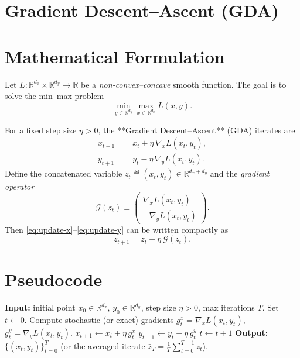 \documentclass{article}
\begin{document}
\section*{Gradient Descent–Ascent (GDA)}

\section*{Mathematical Formulation}
Let $L:\mathbb{R}^{d_x}\times\mathbb{R}^{d_y}\rightarrow\mathbb{R}$ be a \emph{non‑convex–concave} smooth function.  
The goal is to solve the min–max problem
\[
\min_{y\in\mathbb{R}^{d_y}}\max_{x\in\mathbb{R}^{d_x}} L(x,y).
\]

For a fixed step size $\eta>0$, the **Gradient Descent–Ascent** (GDA) iterates are
\begin{align}
x_{t+1} &= x_t + \eta\,\nabla_x L(x_t,y_t), \label{eq:update-x}\\
y_{t+1} &= y_t - \eta\,\nabla_y L(x_t,y_t). \label{eq:update-y}
\end{align}
Define the concatenated variable $z_t\eqdef (x_t,y_t)\in\mathbb{R}^{d_x+d_y}$ and the \emph{gradient operator}
\[
\mathcal{G}(z_t)\equiv \begin{pmatrix}
\nabla_x L(x_t,y_t)\\[2mm]
-\nabla_y L(x_t,y_t)
\end{pmatrix}.
\]
Then \eqref{eq:update-x}–\eqref{eq:update-y} can be written compactly as
\[
z_{t+1}=z_t+\eta\,\mathcal{G}(z_t).
\]

\section*{Pseudocode}
\begin{algorithm}[H]
\caption{Gradient Descent–Ascent (GDA)}
\begin{algorithmic}[1]
\State \textbf{Input:} initial point $x_0\in\mathbb{R}^{d_x}$, $y_0\in\mathbb{R}^{d_y}$, step size $\eta>0$, max iterations $T$.
\State Set $t\gets0$.
    \State Compute stochastic (or exact) gradients $g^x_t=\nabla_x L(x_t,y_t)$, $g^y_t=\nabla_y L(x_t,y_t)$.
    \State $x_{t+1}\gets x_t+\eta\, g^x_t$ 
    \State $y_{t+1}\gets y_t-\eta\, g^y_t$ 
    \State $t\gets t+1$
\EndWhile
\State \textbf{Output:} $\{(x_t,y_t)\}_{t=0}^T$ (or the averaged iterate $\bar z_T=\frac1T\sum_{t=0}^{T-1}z_t$).
\end{algorithmic}
\end{algorithm}
\end{document}
